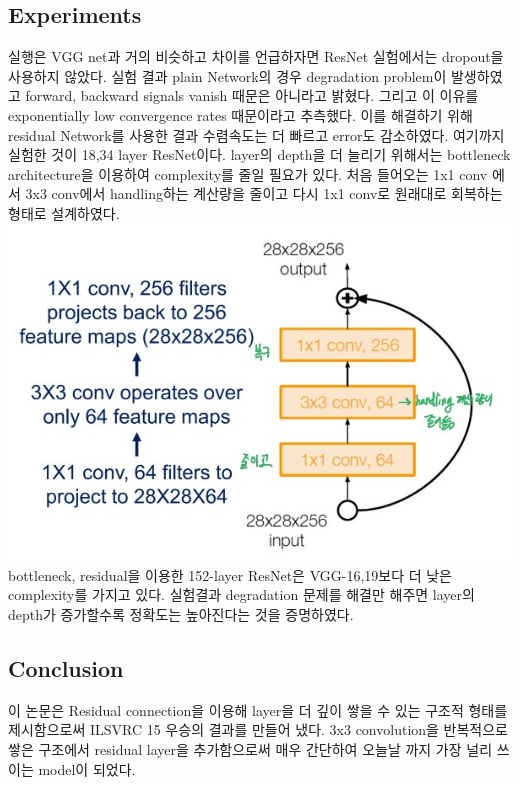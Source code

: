 \documentclass[extendedabs]{bmvc2k}
\begin{document}
\subsection{Experiments}
실행은 VGG net과 거의 비슷하고 차이를 언급하자면 ResNet 실험에서는 dropout을 사용하지 않았다. 실험 결과 plain Network의 경우
degradation problem이 발생하였고 forward, backward signals vanish 때문은 아니라고 밝혔다. 그리고 이 이유를 exponentially low convergence rates 때문이라고 추측했다.
이를 해결하기 위해 residual Network를 사용한 결과 수렴속도는 더 빠르고 error도 감소하였다. 여기까지 실험한 것이 18,34 layer ResNet이다. 
layer의 depth을 더 늘리기 위해서는 bottleneck architecture을 이용하여 complexity를 줄일 필요가 있다. 처음 들어오는
1x1 conv 에서 3x3 conv에서 handling하는 계산량을 줄이고 다시 1x1 conv로 원래대로 회복하는 형태로 설계하였다.
\newline  \includegraphics[width=\linewidth]{images/12_residual.PNG}
\newline bottleneck, residual을 이용한 152-layer ResNet은 VGG-16,19보다 더 낮은 complexity를 가지고 있다. 실험결과 degradation 문제를 해결만 해주면 
layer의 depth가 증가할수록 정확도는 높아진다는 것을 증명하였다.

\subsection{Conclusion}
이 논문은 Residual connection을 이용해 layer을 더 깊이 쌓을 수 있는 구조적 형태를 제시함으로써 ILSVRC 15 우승의 결과를 만들어 냈다. 3x3 convolution을 반복적으로 쌓은 구조에서
residual layer을 추가함으로써 매우 간단하여 오늘날 까지 가장 널리 쓰이는 model이 되었다.
\end{document}
